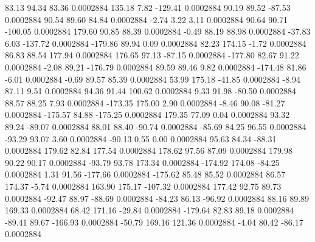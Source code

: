        83.13       94.34       83.36     0.0002884
      135.18        7.82     -129.41     0.0002884
       90.19       89.52      -87.53     0.0002884
       90.54       89.60       84.84     0.0002884
       -2.74        3.22        3.11     0.0002884
       90.64       90.71     -100.05     0.0002884
      179.60       90.85       88.39     0.0002884
       -0.49       88.19       88.98     0.0002884
      -37.83        6.03     -137.72     0.0002884
     -179.86       89.94        0.09     0.0002884
       82.23      174.15       -1.72     0.0002884
       86.83       88.54      177.94     0.0002884
      176.65       97.13      -87.15     0.0002884
     -177.80       82.67       91.22     0.0002884
       -2.08       89.21     -176.79     0.0002884
       89.59       89.46        9.82     0.0002884
     -174.48       81.86       -6.01     0.0002884
       -0.69       89.57       85.39     0.0002884
       53.99      175.18      -41.85     0.0002884
       -8.94       87.11        9.51     0.0002884
       94.36       91.44      100.62     0.0002884
        9.33       91.98      -80.50     0.0002884
       88.57       88.25        7.93     0.0002884
     -173.35      175.00        2.90     0.0002884
       -8.46       90.08      -81.27     0.0002884
     -175.57       84.88     -175.25     0.0002884
      179.35       77.09        0.04     0.0002884
       93.32       89.24      -89.07     0.0002884
       88.01       88.40      -90.74     0.0002884
      -85.69       84.25       96.55     0.0002884
      -93.29       93.07        3.60     0.0002884
      -90.13        0.55        0.00     0.0002884
       95.63       84.34      -88.31     0.0002884
      179.62       82.84      177.54     0.0002884
      178.62       97.56       87.09     0.0002884
      179.98       90.22       90.17     0.0002884
      -93.79       93.78      173.34     0.0002884
     -174.92      174.08      -84.25     0.0002884
        1.31       91.56     -177.66     0.0002884
     -175.62       85.48       85.52     0.0002884
       86.57      174.37       -5.74     0.0002884
      163.90      175.17     -107.32     0.0002884
      177.42       92.75       89.73     0.0002884
      -92.47       88.97      -88.69     0.0002884
      -84.23       86.13      -96.92     0.0002884
       88.16       89.89      169.33     0.0002884
       68.42      171.16      -29.84     0.0002884
     -179.64       82.83       89.18     0.0002884
      -89.41       89.67     -166.93     0.0002884
      -50.79      169.16      121.36     0.0002884
       -4.04       80.42      -86.17     0.0002884
